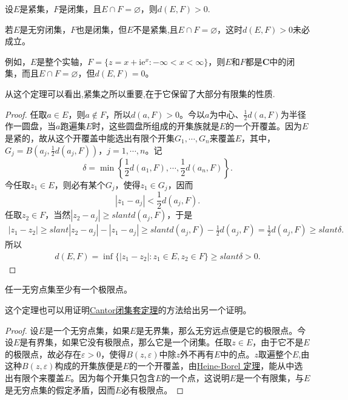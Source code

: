 \documentclass[../../main.tex]{subfiles}
\begin{document}
\begin{theorem}\label{theorem:紧集和闭集无交则距离大于0}
设\(E\)是紧集，\(F\)是闭集，且\(E \cap F = \varnothing\)，则$d(E, F) > 0.$
\end{theorem}
\begin{remark}
若\(E\)是无穷闭集，\(F\)也是闭集，但$E$不是紧集,且\(E \cap F = \varnothing\)，这时\(d(E, F) > 0\)未必成立。

例如，\(E\)是整个实轴，\(F = \{ z = x + \mathrm{i}\mathrm{e}^x : -\infty < x < \infty \}\)，则\(E\)和\(F\)都是\(\mathbf{C}\)中的闭集，而且\(E \cap F = \varnothing\)，但\(d(E, F) = 0\)。
\end{remark}
\begin{note}
从这个定理可以看出,紧集之所以重要,在于它保留了大部分有限集的性质.
\end{note}
\begin{proof}
任取\(a \in E\)，则\(a \notin F\)，所以\(d(a, F) > 0\)。今以\(a\)为中心、\(\frac{1}{2}d(a, F)\)为半径作一圆盘，当\(a\)跑遍集\(E\)时，这些圆盘所组成的开集族就是\(E\)的一个开覆盖。因为\(E\)是紧的，故从这个开覆盖中能选出有限个开集\(G_1, \cdots, G_n\)来覆盖\(E\)，其中，\(G_j = B\left( a_j, \frac{1}{2}d(a_j, F) \right)\)，\(j = 1, \cdots, n\)。记
\[
\delta = \min\left\{ \frac{1}{2}d(a_1, F), \cdots, \frac{1}{2}d(a_n, F) \right\}.
\]
今任取\(z_1 \in E\)，则必有某个\(G_j\)，使得\(z_1 \in G_j\)，因而
\[
| z_1 - a_j | < \frac{1}{2}d(a_j, F).
\]
任取\(z_2 \in F\)，当然\(| z_2 - a_j | \geqslant slant d(a_j, F)\)，于是
\[
\begin{split}
| z_1 - z_2 | \geqslant slant | z_2 - a_j | - | z_1 - a_j | \geqslant slant d(a_j, F) - \frac{1}{2}d(a_j, F) = \frac{1}{2}d(a_j, F) \geqslant slant \delta.
\end{split}
\]
所以
\[
\begin{split}
d(E, F) = \inf\{ | z_1 - z_2 | : z_1 \in E, z_2 \in F \}  \geqslant slant \delta > 0.
\end{split}
\] 
\end{proof}

\begin{theorem}\label{theorem:Bolzano-Weierstrass定理}
任一无穷点集至少有一个极限点。
\end{theorem}
\begin{remark}
这个定理也可以用证明\hyperref[theorem:Cantor闭集套定理]{Cantor闭集套定理}的方法给出另一个证明。
\end{remark}
\begin{proof}
设\(E\)是一个无穷点集，如果\(E\)是无界集，那么无穷远点便是它的极限点。今设\(E\)是有界集，如果它没有极限点，那么它是一个闭集。任取\(z \in E\)，由于它不是\(E\)的极限点，故必存在\(\varepsilon > 0\)，使得\(B(z, \varepsilon)\)中除\(z\)外不再有\(E\)中的点。$z$取遍整个$E$,由这种\(B(z, \varepsilon)\)构成的开集族便是\(E\)的一个开覆盖，由\hyperref[theorem:Heine-Borel定理]{Heine-Borel 定理}，能从中选出有限个来覆盖\(E\)。因为每个开集只包含\(E\)的一个点，这说明\(E\)是一个有限集，与\(E\)是无穷点集的假定矛盾，因而\(E\)必有极限点。
\end{proof}
\end{document}

